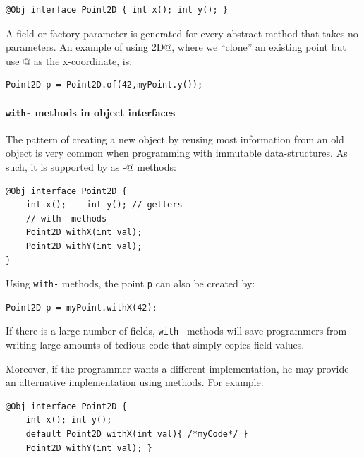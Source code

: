 \begin{lstlisting}
@Obj interface Point2D { int x(); int y(); }
\end{lstlisting}

\noindent A field or factory parameter is generated for every
abstract method that takes no parameters.
 An example of using \Q@Point2D@, where we ``clone'' an existing point
 but use
 @ as the x-coordinate, is:
\begin{lstlisting}
Point2D p = Point2D.of(42,myPoint.y());
\end{lstlisting}

\paragraph{\texttt{with-} methods in object interfaces}
The pattern of creating a new object by reusing most information from an old
object is very common when programming with immutable
data-structures. As such, it is
supported by \mixin as \Q@with-@ methods: 
\begin{lstlisting}
@Obj interface Point2D {
    int x();    int y(); // getters
    // with- methods
    Point2D withX(int val);
    Point2D withY(int val);
}
\end{lstlisting}

\noindent Using \texttt{with-} methods, the point \texttt{p} can also be created
by:

\begin{lstlisting}
Point2D p = myPoint.withX(42);
\end{lstlisting}

\noindent If there is a large number of fields, \texttt{with-} methods
will save programmers from writing large amounts of tedious code that
simply copies field values.

Moreover, if the programmer wants a different implementation, he may
provide an alternative implementation using \Q@default@ methods. For example:
\begin{lstlisting}
@Obj interface Point2D {
    int x(); int y();
    default Point2D withX(int val){ /*myCode*/ }
    Point2D withY(int val); }
\end{lstlisting}

